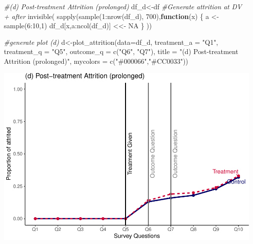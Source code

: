 \documentclass[
]{article}
\newenvironment{Shaded}{\begin{snugshade}}{\end{snugshade}}
\newcommand{\AttributeTok}[1]{\textcolor[rgb]{0.77,0.63,0.00}{#1}}
\newcommand{\CommentTok}[1]{\textcolor[rgb]{0.56,0.35,0.01}{\textit{#1}}}
\newcommand{\ConstantTok}[1]{\textcolor[rgb]{0.00,0.00,0.00}{#1}}
\newcommand{\ControlFlowTok}[1]{\textcolor[rgb]{0.13,0.29,0.53}{\textbf{#1}}}
\newcommand{\DecValTok}[1]{\textcolor[rgb]{0.00,0.00,0.81}{#1}}
\newcommand{\FunctionTok}[1]{\textcolor[rgb]{0.00,0.00,0.00}{#1}}
\newcommand{\NormalTok}[1]{#1}
\newcommand{\OtherTok}[1]{\textcolor[rgb]{0.56,0.35,0.01}{#1}}
\newcommand{\SpecialCharTok}[1]{\textcolor[rgb]{0.00,0.00,0.00}{#1}}
\newcommand{\StringTok}[1]{\textcolor[rgb]{0.31,0.60,0.02}{#1}}
\begin{document}
\begin{Shaded}
\begin{Highlighting}[]
\CommentTok{\#(d) Post{-}treatment Attrition (prolonged)}
\NormalTok{df\_d}\OtherTok{\textless{}{-}}\NormalTok{df}
\CommentTok{\#Generate attrition at DV + after}
\FunctionTok{invisible}\NormalTok{(}
\FunctionTok{sapply}\NormalTok{(}\FunctionTok{sample}\NormalTok{(}\DecValTok{1}\SpecialCharTok{:}\FunctionTok{nrow}\NormalTok{(df\_d), }\DecValTok{700}\NormalTok{),}\ControlFlowTok{function}\NormalTok{(x) \{}
\NormalTok{    a }\OtherTok{\textless{}{-}} \FunctionTok{sample}\NormalTok{(}\DecValTok{6}\SpecialCharTok{:}\DecValTok{10}\NormalTok{,}\DecValTok{1}\NormalTok{)}
\NormalTok{    df\_d[x,a}\SpecialCharTok{:}\FunctionTok{ncol}\NormalTok{(df\_d)] }\OtherTok{\textless{}\textless{}{-}} \ConstantTok{NA}
\NormalTok{\}}
\NormalTok{))}

\CommentTok{\#generate plot (d)}
\NormalTok{d}\OtherTok{\textless{}{-}}\FunctionTok{plot\_attrition}\NormalTok{(}\AttributeTok{data=}\NormalTok{df\_d,}
              \AttributeTok{treatment\_a =} \StringTok{"Q1"}\NormalTok{,}
              \AttributeTok{treatment\_q =} \StringTok{"Q5"}\NormalTok{,}
              \AttributeTok{outcome\_q =}  \FunctionTok{c}\NormalTok{(}\StringTok{"Q6"}\NormalTok{, }\StringTok{"Q7"}\NormalTok{),}
              \AttributeTok{title =} \StringTok{"(d) Post{-}treatment Attrition (prolonged)"}\NormalTok{,}
              \AttributeTok{mycolors =} \FunctionTok{c}\NormalTok{(}\StringTok{"\#000066"}\NormalTok{,}\StringTok{"\#CC0033"}\NormalTok{))}
\end{Highlighting}
\end{Shaded}

\includegraphics{paper_replication_files/figure-latex/timeline-4.pdf}
\end{document}

